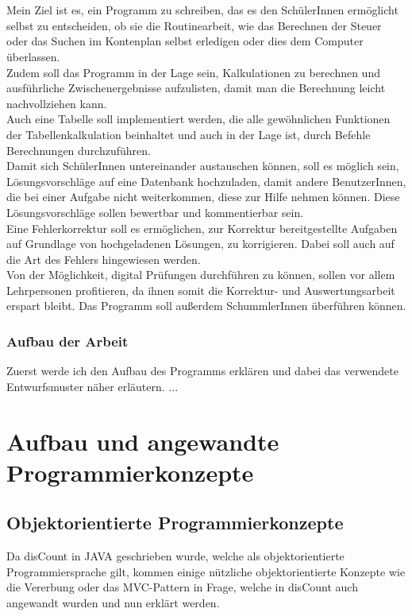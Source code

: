 \documentclass[12pt]{report}
\begin{document}
\noindent \\\\Mein Ziel ist es, ein Programm zu schreiben, das es den SchülerInnen ermöglicht selbst zu entscheiden, ob sie die Routinearbeit, wie das Berechnen der Steuer oder das Suchen im Kontenplan selbst erledigen oder dies dem Computer überlassen.\\
Zudem soll das Programm in der Lage sein, Kalkulationen zu berechnen und ausführliche Zwischenergebnisse aufzulisten, damit man die Berechnung leicht nachvollziehen kann.\\
Auch eine Tabelle soll implementiert werden, die alle gewöhnlichen Funktionen der Tabellenkalkulation beinhaltet und auch in der Lage ist, durch Befehle Berechnungen durchzuführen.\\
Damit sich SchülerInnen untereinander austauschen können, soll es möglich sein, Lösungsvorschläge auf eine Datenbank hochzuladen, damit andere BenutzerInnen, die bei einer Aufgabe nicht weiterkommen, diese zur Hilfe nehmen können. Diese Lösungsvorschläge sollen bewertbar und kommentierbar sein.\\
Eine Fehlerkorrektur soll es ermöglichen, zur Korrektur bereitgestellte Aufgaben auf Grundlage von hochgeladenen Lösungen, zu korrigieren. Dabei soll auch auf die Art des Fehlers hingewiesen werden.\\
Von der Möglichkeit, digital Prüfungen durchführen zu können, sollen vor allem Lehrpersonen profitieren, da ihnen somit die Korrektur- und Auswertungsarbeit erspart bleibt. Das Programm soll außerdem SchummlerInnen überführen können.


\section{Aufbau der Arbeit}
Zuerst werde ich den Aufbau des Programms erklären und dabei das verwendete Entwurfsmuster näher erläutern. ...


\part{Aufbau und angewandte Programmierkonzepte}
 
\chapter{Objektorientierte Programmierkonzepte}
  
Da disCount in JAVA geschrieben wurde, welche als objektorientierte Programmiersprache gilt, kommen einige nützliche objektorientierte Konzepte wie die Vererbung oder das MVC-Pattern in Frage, welche in disCount auch angewandt wurden und nun erklärt werden.
  
\end{document}
